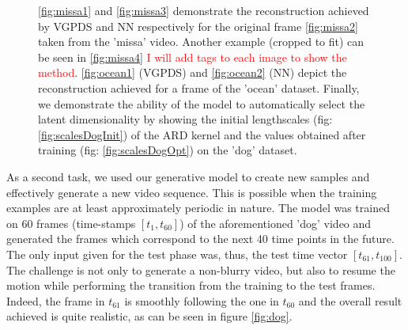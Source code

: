 \documentclass{article} %
\begin{document}
\begin{figure}[ht]
\begin{center}
{}
\end{center}
\caption{\small{
\ref{fig:missa1} and \ref{fig:missa3} demonstrate the reconstruction achieved by VGPDS and NN respectively for the original frame \ref{fig:missa2} taken from the 'missa' video. Another example (cropped to fit) can be seen in \ref{fig:missa4} \textcolor{red}{I will add tags to each image to show the method}. \ref{fig:ocean1} (VGPDS) and \ref{fig:ocean2} (NN) depict the reconstruction achieved for a frame of the 'ocean' dataset. 
Finally, we demonstrate the ability of the model to automatically select the latent dimensionality by showing the initial lengthscales (fig: \ref{fig:scalesDogInit}) of the ARD kernel and the values obtained after training (fig: \ref{fig:scalesDogOpt}) on the 'dog' dataset.
}
}
\label{fig:video1}
\end{figure}

\par As a second task, we used our generative model to create new samples and effectively generate a new video sequence. This is possible when the training examples are at least approximately periodic in nature. The model was trained on 60 frames (time-stamps $[t_1, t_{60}]$) of the aforementioned 'dog' video and generated the frames which correspond to the next 40 time points in the future. The only input given for the test phase was, thus, the test time vector $[t_{61}, t_{100}]$. The challenge is not only to generate a non-blurry video, but also to resume the motion while performing the transition from the training to the test frames. Indeed, the frame in $t_{61}$ is smoothly following the one in $t_{60}$ and the overall result achieved is quite realistic, as can be seen in figure \ref{fig:dog}. 
\end{document}
